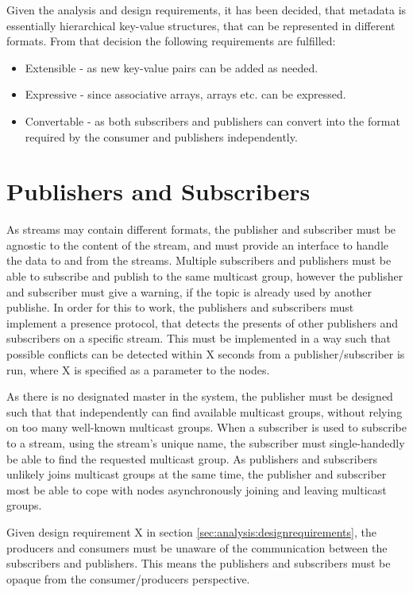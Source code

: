 Given the analysis and design requirements, it has been decided, that metadata is essentially hierarchical key-value structures, that can be represented in different formats. From that decision the following requirements are fulfilled:
\begin{itemize}
	\item Extensible - as new key-value pairs can be added as needed.
	\item Expressive - since associative arrays, arrays etc. can be expressed.
	\item Convertable - as both subscribers and publishers can convert into the format required by the consumer and publishers independently.
\end{itemize}

\section{Publishers and Subscribers}
As streams may contain different formats, the publisher and subscriber must be agnostic to the content of the stream, and must provide an interface to handle the data to and from the streams.
Multiple subscribers and publishers must be able to subscribe and publish to the same multicast group, however the publisher and subscriber must give a warning, if the topic is already used by another publishe. In order for this to work, the publishers and subscribers must implement a presence protocol, that detects the presents of other publishers and subscribers on a specific stream. This must be implemented in a way such that possible conflicts can be detected within X seconds from a publisher/subscriber is run, where X is specified as a parameter to the nodes.

As there is no designated master in the system, the publisher must be designed such that that independently can find available multicast groups, without relying on too many well-known multicast groups. When a subscriber is used to subscribe to a stream, using the stream's unique name, the subscriber must single-handedly be able to find the requested multicast group.
As publishers and subscribers unlikely joins multicast groups at the same time, the publisher and subscriber most be able to cope with nodes asynchronously joining and leaving multicast groups.

Given design requirement X in section \ref{sec:analysis:designrequirements}, the producers and consumers must be unaware of the communication between the subscribers and publishers. This means the publishers and subscribers must be opaque from the consumer/producers perspective.

